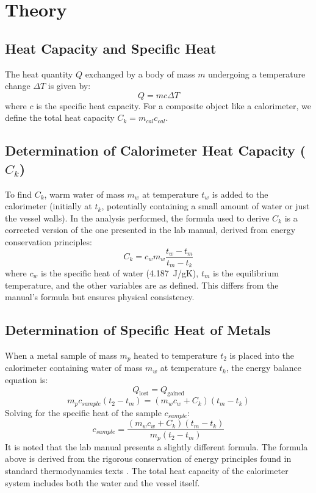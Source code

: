 \documentclass[journal]{IEEEtran}
\begin{document}
\section{Theory}

\subsection{Heat Capacity and Specific Heat}
The heat quantity $Q$ exchanged by a body of mass $m$ undergoing a temperature change $\Delta T$ is given by:
\begin{equation}
    Q = m c \Delta T
    \label{eq:heat}
\end{equation}
where $c$ is the specific heat capacity. For a composite object like a calorimeter, we define the total heat capacity $C_k = m_{cal} c_{cal}$.

\subsection{Determination of Calorimeter Heat Capacity ($C_k$)}
To find $C_k$, warm water of mass $m_w$ at temperature $t_w$ is added to the calorimeter (initially at $t_k$, potentially containing a small amount of water or just the vessel walls). In the analysis performed, the formula used to derive $C_k$ is a corrected version of the one presented in the lab manual, derived from energy conservation principles:
\begin{equation}
    C_k = c_w m_w \frac{t_w - t_m}{t_m - t_k}
    \label{eq:Ck}
\end{equation}
where $c_w$ is the specific heat of water (\SI{4.187}{J/gK}), $t_m$ is the equilibrium temperature, and the other variables are as defined. This differs from the manual's formula but ensures physical consistency.

\subsection{Determination of Specific Heat of Metals}
When a metal sample of mass $m_p$ heated to temperature $t_2$ is placed into the calorimeter containing water of mass $m_w$ at temperature $t_k$, the energy balance equation is:
\begin{equation}
    Q_{\text{lost}} = Q_{\text{gained}}
\end{equation}
\begin{equation}
    m_p c_{sample} (t_2 - t_m) = (m_w c_w + C_k)(t_m - t_k)
\end{equation}
Solving for the specific heat of the sample $c_{sample}$:
\begin{equation}
    c_{sample} = \frac{(m_w c_w + C_k)(t_m - t_k)}{m_p (t_2 - t_m)}
    \label{eq:csample}
\end{equation}
It is noted that the lab manual presents a slightly different formula. The formula above is derived from the rigorous conservation of energy principles found in standard thermodynamics texts \cite{greiner}. The total heat capacity of the calorimeter system includes both the water and the vessel itself.
\end{document}
